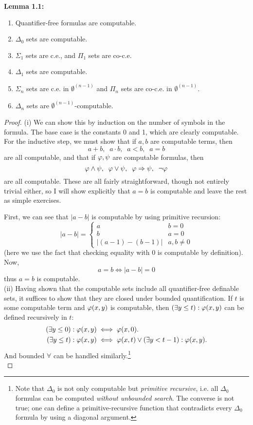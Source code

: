 \documentclass{amsart}
\begin{document}
	\noindent \textbf{Lemma 1.1:}
	\begin{enumerate}[label=(\roman*)]
		\item Quantifier-free formulas are computable.
		\item $\Delta_0$ sets are computable.
		\item $\Sigma_1$ sets are c.e., and $\Pi_1$ sets are co-c.e.
		\item $\Delta_1$ sets are computable.
		\item $\Sigma_n$ sets are c.e. in $\emptyset^{(n-1)}$ and $\Pi_n$ sets are co-c.e. in $\emptyset^{(n-1)}$.
		\item $\Delta_n$ sets are $\emptyset^{(n-1)}$-computable.
	\end{enumerate}
	\begin{proof}
		(i) We can show this by induction on the number of symbols in the formula. The base case is the constants 0 and 1, which are clearly computable. For the inductive step, we must show that if $a,b$ are computable terms, then
		$$
		a+b, \;\; a\cdot b, \;\; a<b, \;\; a=b
		$$
		are all computable, and that if $\varphi,\psi$ are computable formulas, then
		$$
		\varphi\wedge \psi, \;\; \varphi\vee \psi, \;\; \varphi \Rightarrow \psi, \;\; \neg \varphi
		$$
		are all computable. These are all fairly straightforward, though not entirely trivial either, so I will show explicitly that $a=b$ is computable and leave the rest as simple exercises.
		
		First, we can see that $|a-b|$ is computable by using primitive recursion:
		$$
		|a-b| = \begin{cases} a & b=0\\
			b & a=0\\
			|(a-1)-(b-1)| & a,b\neq 0
		\end{cases}
		$$
		(here we use the fact that checking equality with 0 is computable by definition). Now, 
		$$
		a=b \iff |a-b|=0
		$$
		thus $a=b$ is computable. \\
		
		(ii) Having shown that the computable sets include all quantifier-free definable sets, it suffices to show that they are closed under bounded quantification. If $t$ is some computable term and $\varphi(x,y)$ is computable, then $(\exists y \leq t):\varphi(x,y)$ can be defined recursively in $t$:
		\begin{align*}
			(\exists y\leq 0):\varphi(x,y) &\iff \varphi(x,0).\\ (\exists y \leq t): \varphi(x,y) &\iff \varphi(x,t) \vee (\exists y < t-1): \varphi(x,y).
		\end{align*}
		And bounded $\forall$ can be handled similarly.\footnote{Note that $\Delta_0$ is not only computable but \textit{primitive recursive}, i.e. all $\Delta_0$ formulas can be computed \textit{without unbounded search}. The converse is not true; one can define a primitive-recursive function that contradicts every $\Delta_0$ formula by using a diagonal argument.}\\
		

\end{proof}
\end{document}
